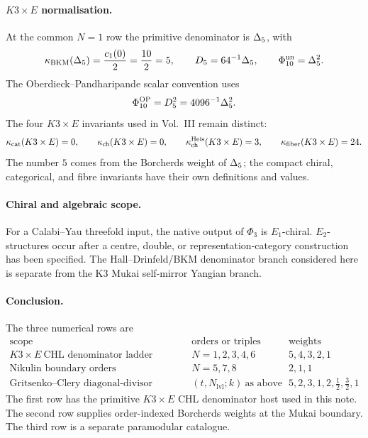 \paragraph{\texorpdfstring{\(K3\times E\)}{K3 x E} normalisation.}
At the common \(N=1\) row the primitive denominator is \(\Delta_5\),
with
\[
  \kappa_{\mathrm{BKM}}(\Delta_5)=\frac{c_1(0)}2=\frac{10}{2}=5,
  \qquad
  D_5=64^{-1}\Delta_5,
  \qquad
  \Phi_{10}^{\mathrm{un}}=\Delta_5^2.
\]
The Oberdieck--Pandharipande scalar convention uses
\[
  \Phi_{10}^{\mathrm{OP}}=D_5^2=4096^{-1}\Delta_5^2.
\]
The four \(K3\times E\) invariants used in Vol.~III remain distinct:
\[
  \kappa_{\mathrm{cat}}(K3\times E)=0,\qquad
  \kappa_{\mathrm{ch}}(K3\times E)=0,\qquad
  \kappa_{\mathrm{ch}}^{\mathrm{Heis}}(K3\times E)=3,\qquad
  \kappa_{\mathrm{fiber}}(K3\times E)=24.
\]
The number \(5\) comes from the Borcherds weight of \(\Delta_5\);
the compact chiral, categorical, and fibre invariants have their own
definitions and values.

\paragraph{Chiral and algebraic scope.}
For a Calabi--Yau threefold input, the native output of \(\Phi_3\) is
\(E_1\)-chiral.  \(E_2\)-structures occur after a centre, double, or
representation-category construction has been specified.  The
Hall--Drinfeld/BKM denominator branch considered here is separate from
the K3 Mukai self-mirror Yangian branch.

\paragraph{Conclusion.}
The three numerical rows are
\[
\begin{array}{c|c|c}
\text{scope} & \text{orders or triples} & \text{weights} \\ \hline
K3\times E\ \text{CHL denominator ladder}
  & N=1,2,3,4,6 & 5,4,3,2,1\\
\text{Nikulin boundary orders}
  & N=5,7,8 & 2,1,1\\
\text{Gritsenko--Clery diagonal-divisor catalogue}
  & (t,N_{\mathrm{lvl}};k)\ \text{as above}
  & 5,2,3,1,2,\tfrac12,\tfrac32,1
\end{array}
\]
The first row has the primitive \(K3\times E\) CHL denominator host used
in this note.  The second row supplies order-indexed Borcherds weights
at the Mukai boundary.  The third row is a separate paramodular
catalogue.

